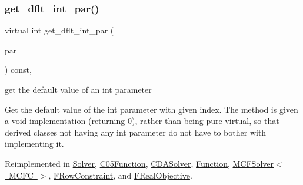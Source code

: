\mbox{\label{class_s_m_spp__di__unipi__it_1_1_thin_compute_interface_aee367363e42f86be5376165878f958f5}} 
\subsubsection{\texorpdfstring{get\+\_\+dflt\+\_\+int\+\_\+par()}{get\_dflt\_int\_par()}}
{\footnotesize\ttfamily virtual int get\+\_\+dflt\+\_\+int\+\_\+par (\begin{DoxyParamCaption}\item[{const \mbox{\hyperlink{class_s_m_spp__di__unipi__it_1_1_thin_compute_interface_aa3d710629ad8c434286726ad810c3b47}{idx\+\_\+type}}}]{par }\end{DoxyParamCaption}) const\hspace{0.3cm}{\ttfamily [inline]}, {\ttfamily [virtual]}}



get the default value of an int parameter 

Get the default value of the int parameter with given index. The method is given a void implementation (returning 0), rather than being pure virtual, so that derived classes not having any int parameter do not have to bother with implementing it. 

Reimplemented in \mbox{\hyperlink{class_s_m_spp__di__unipi__it_1_1_solver_a75dd1491b74c4b9476755e061dce3e04}{Solver}}, \mbox{\hyperlink{class_s_m_spp__di__unipi__it_1_1_c05_function_a75dd1491b74c4b9476755e061dce3e04}{C05\+Function}}, \mbox{\hyperlink{class_s_m_spp__di__unipi__it_1_1_c_d_a_solver_a75dd1491b74c4b9476755e061dce3e04}{C\+D\+A\+Solver}}, \mbox{\hyperlink{class_s_m_spp__di__unipi__it_1_1_function_a75dd1491b74c4b9476755e061dce3e04}{Function}}, \mbox{\hyperlink{class_s_m_spp__di__unipi__it_1_1_m_c_f_solver_a75dd1491b74c4b9476755e061dce3e04}{M\+C\+F\+Solver$<$ M\+C\+F\+C $>$}}, \mbox{\hyperlink{class_s_m_spp__di__unipi__it_1_1_f_row_constraint_a75dd1491b74c4b9476755e061dce3e04}{F\+Row\+Constraint}}, and \mbox{\hyperlink{class_s_m_spp__di__unipi__it_1_1_f_real_objective_a75dd1491b74c4b9476755e061dce3e04}{F\+Real\+Objective}}.

